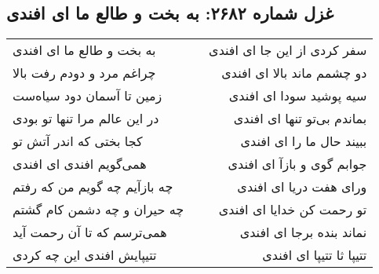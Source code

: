 \begin{center}
\section*{غزل شماره ۲۶۸۲: به بخت و طالع ما ای افندی}
\label{sec:2682}
\begin{longtable}{l p{0.5cm} r}
به بخت و طالع ما ای افندی
&&
سفر کردی از این جا ای افندی
\\
چراغم مرد و دودم رفت بالا
&&
دو چشمم ماند بالا ای افندی
\\
زمین تا آسمان دود سیاه‌ست
&&
سیه پوشید سودا ای افندی
\\
در این عالم مرا تنها تو بودی
&&
بماندم بی‌تو تنها ای افندی
\\
کجا بختی که اندر آتش تو
&&
ببیند حال ما را ای افندی
\\
همی‌گویم افندی ای افندی
&&
جوابم گوی و بازآ ای افندی
\\
چه بازآیم چه گویم من که رفتم
&&
ورای هفت دریا ای افندی
\\
چه حیران و چه دشمن کام گشتم
&&
تو رحمت کن خدایا ای افندی
\\
همی‌ترسم که تا آن رحمت آید
&&
نماند بنده برجا ای افندی
\\
تتیپایش افندی این چه کردی
&&
تتیپا ثا تتیپا ای افندی
\\
\end{longtable}
\end{center}
